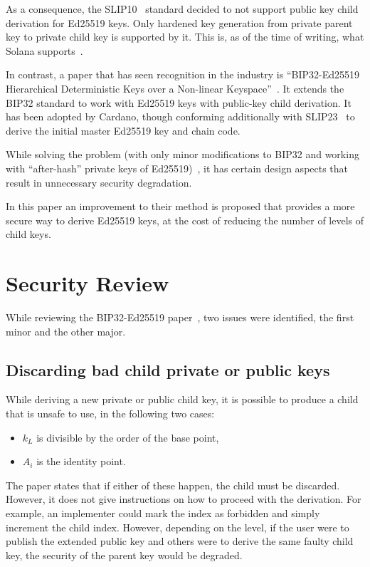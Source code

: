 \documentclass[12pt, a4paper, twocolumn]{article}
\begin{document}
As a consequence, the SLIP10~\cite{SLIP10} standard decided to not support public key child derivation for Ed25519 keys.
Only hardened key generation from private parent key to private child key is supported by it.
This is, as of the time of writing, what Solana supports~\cite{SolanaBip32}.

In contrast, a paper that has seen recognition in the industry is ``BIP32-Ed25519 Hierarchical Deterministic Keys over a Non-linear Keyspace''~\cite{BIP32-Ed25519}.
It extends the BIP32 standard to work with Ed25519 keys with public-key child derivation.
It has been adopted by Cardano, though conforming additionally with SLIP23~\cite{SLIP23} to derive the initial master Ed25519 key and chain code.

While solving the problem (with only minor modifications to BIP32 and working with ``after-hash'' private keys of Ed25519)~\cite{BIP32-Ed25519}, it has certain design aspects that result in unnecessary security degradation.

In this paper an improvement to their method is proposed that provides a more secure way to derive Ed25519 keys, at the cost of reducing the number of levels of child keys.

\section{Security Review}

While reviewing the BIP32-Ed25519 paper~\cite{BIP32-Ed25519}, two issues were identified, the first minor and the other major.

\subsection{Discarding bad child private or public keys}

While deriving a new private or public child key, it is possible to produce a child that is unsafe to use, in the following two cases:
\begin{itemize}[label=\textendash, itemsep=-0.5em]
\item $k_L$ is divisible by the order of the base point,
\item $A_i$ is the identity point.
\end{itemize}

The paper states that if either of these happen, the child must be discarded.
However, it does not give instructions on how to proceed with the derivation.
For example, an implementer could mark the index as forbidden and simply increment the child index.
However, depending on the level, if the user were to publish the extended public key and others were to derive the same faulty child key, the security of the parent key would be degraded.
\end{document}
